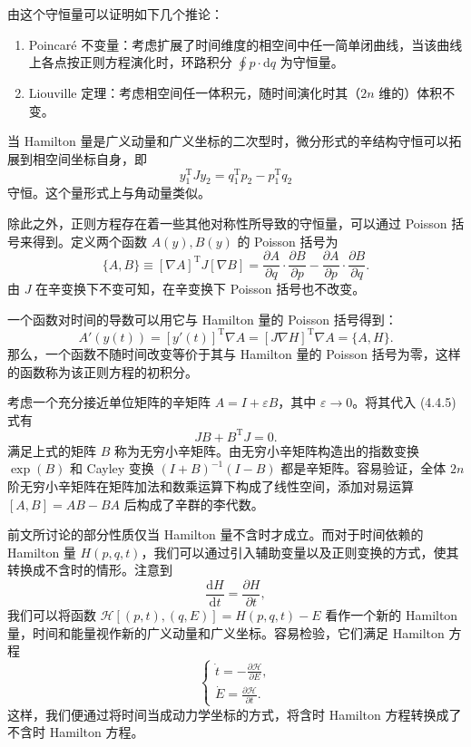 由这个守恒量可以证明如下几个推论：
\begin{enumerate}[label=(\arabic*)]
\item Poincaré 不变量：考虑扩展了时间维度的相空间中任一简单闭曲线，当该曲线上各点按正则方程演化时，环路积分 $\oint p\cdot\mathrm dq$ 为守恒量。
\item Liouville 定理：考虑相空间任一体积元，随时间演化时其（$2n$ 维的）体积不变。
\end{enumerate}

当 Hamilton 量是广义动量和广义坐标的二次型时，微分形式的辛结构守恒可以拓展到相空间坐标自身，即
\begin{equation}
 y_1^{\mathrm T}Jy_2=q_1^{\mathrm T}p_2-p_1^{\mathrm T}q_2
\tag{4.4.8}
\end{equation}
守恒。这个量形式上与角动量类似。

除此之外，正则方程存在着一些其他对称性所导致的守恒量，可以通过 Poisson 括号来得到。定义两个函数 $A(y),B(y)$ 的 Poisson 括号为
\begin{equation}
\{A,B\}\equiv[\nabla A]^{\mathrm T}J[\nabla B]
=\frac{\partial A}{\partial q}\cdot\frac{\partial B}{\partial p}
 -\frac{\partial A}{\partial p}\cdot\frac{\partial B}{\partial q}.
\tag{4.4.9}
\end{equation}
由 $J$ 在辛变换下不变可知，在辛变换下 Poisson 括号也不改变。

一个函数对时间的导数可以用它与 Hamilton 量的 Poisson 括号得到：
\begin{equation}
A'(y(t))=[y'(t)]^{\mathrm T}\nabla A=[J\nabla H]^{\mathrm T}\nabla A=\{A,H\}.
\tag{4.4.10}
\end{equation}
那么，一个函数不随时间改变等价于其与 Hamilton 量的 Poisson 括号为零，这样的函数称为该正则方程的初积分。

考虑一个充分接近单位矩阵的辛矩阵 $A=I+\varepsilon B$，其中 $\varepsilon\to0$。将其代入 (4.4.5) 式有
\begin{equation}
JB+B^{\mathrm T}J=0.
\tag{4.4.11}
\end{equation}
满足上式的矩阵 $B$ 称为无穷小辛矩阵。由无穷小辛矩阵构造出的指数变换 $\exp(B)$ 和 Cayley 变换 $(I+B)^{-1}(I-B)$ 都是辛矩阵。容易验证，全体 $2n$ 阶无穷小辛矩阵在矩阵加法和数乘运算下构成了线性空间，添加对易运算 $[A,B]=AB-BA$ 后构成了辛群的李代数。

前文所讨论的部分性质仅当 Hamilton 量不含时才成立。而对于时间依赖的 Hamilton 量 $H(p,q,t)$，我们可以通过引入辅助变量以及正则变换的方式，使其转换成不含时的情形。注意到
\begin{equation}
\frac{\mathrm dH}{\mathrm dt}=\frac{\partial H}{\partial t},
\tag{4.4.12}
\end{equation}
我们可以将函数 $\mathcal H[(p,t),(q,E)]=H(p,q,t)-E$ 看作一个新的 Hamilton 量，时间和能量视作新的广义动量和广义坐标。容易检验，它们满足 Hamilton 方程
\begin{equation}
\begin{cases}
\displaystyle \dot t=-\frac{\partial\mathcal H}{\partial E},\\[6pt]
\displaystyle \dot E=\frac{\partial\mathcal H}{\partial t}.
\end{cases}
\tag{4.4.13}
\end{equation}
这样，我们便通过将时间当成动力学坐标的方式，将含时 Hamilton 方程转换成了不含时 Hamilton 方程。

